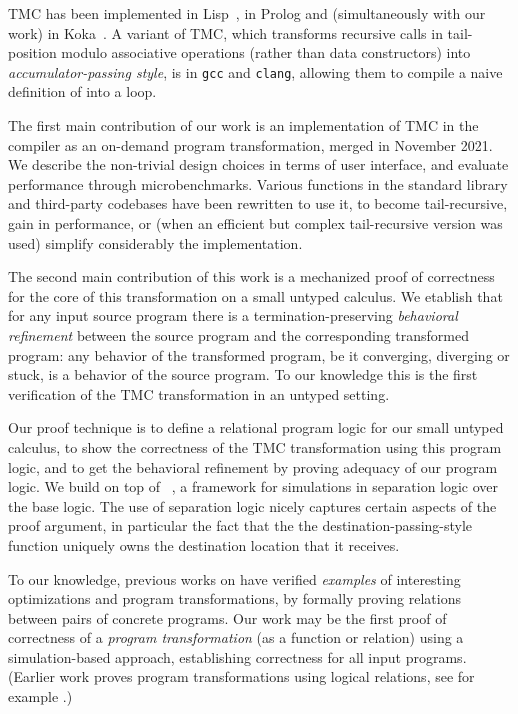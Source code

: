 TMC has been implemented in Lisp~\citep*{risch-73,friedman-wise-75}, in Prolog and (simultaneously with our work) in Koka~\citep*{tmc-koka-2023}. A variant of TMC, which transforms recursive calls in tail-position modulo associative operations (rather than data constructors) into \emph{accumulator-passing style}, is in \texttt{gcc} and \texttt{clang}, allowing them to compile a naive definition of  into a loop.

The first main contribution of our work is an implementation of TMC in the \OCaml compiler as an on-demand program transformation,
merged in November 2021.
%
We describe the non-trivial design choices in terms of user interface, and evaluate performance through microbenchmarks.
%
Various functions in the standard library and third-party codebases have been rewritten to use it, to become tail-recursive, gain in performance, or (when an efficient but complex tail-recursive version was used) simplify considerably the implementation.

The second main contribution of this work is a mechanized proof of correctness for the core of this transformation on a small untyped calculus.
%
We etablish that for any input source program there is a termination-preserving \emph{behavioral refinement} between the source program and the corresponding transformed program: any behavior of the transformed program, be it converging, diverging or stuck, is a behavior of the source program.
%
To our knowledge this is the first verification of the TMC transformation in an untyped setting.

Our proof technique is to define a relational program logic for our small untyped calculus, to show the correctness of the TMC transformation using this program logic, and to get the behavioral refinement by proving adequacy of our program logic. We build on top of \Simuliris~\citep*{simuliris-2022}, a framework for simulations in separation logic over the \Iris base logic. The use of separation logic nicely captures certain aspects of the proof argument, in particular the fact that the the destination-passing-style function uniquely owns the destination location that it receives.

To our knowledge, previous works on \Simuliris have verified \emph{examples} of interesting optimizations and program transformations, by formally proving relations between pairs of concrete programs. Our work may be the first proof of correctness of a \emph{program transformation} (as a function or relation) using a simulation-based approach, establishing correctness for all input programs. (Earlier \Iris work proves program transformations using logical relations, see for example \citet*{tassarotti-2017}.)

